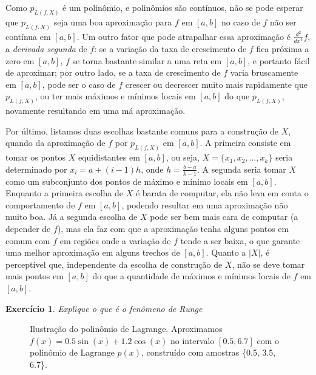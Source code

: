 \documentclass[]{article}
\newtheorem{exercicio}{Exercício}
\numberwithin{equation}{section}
\begin{document}
Como $p_{L(f, X)}$ é um polinômio, e polinômios são contínuos, não se
pode esperar que $p_{L(f, X)}$ seja uma boa aproximação para $f$ em
$[a, b]$ no caso de $f$ não ser contínua em $[a, b]$. Um outro fator
que pode atrapalhar essa aproximação é $\frac{d^2}{dx^2} f$, a
\emph{derivada segunda} de $f$: se a variação da taxa de crescimento
de $f$ fica próxima a zero em $[a, b]$, $f$ se torna bastante similar
a uma reta em $[a, b]$, e portanto fácil de aproximar; por outro lado,
se a taxa de crescimento de $f$ varia bruscamente em $[a, b]$, pode
ser o caso de $f$ crescer ou decrescer muito mais rapidamente que
$p_{L(f, X)}$, ou ter mais máximos e mínimos locais em $[a, b]$ do que
$p_{L(f, X)}$, novamente resultando em uma má aproximação.

Por último, listamos duas escolhas bastante comuns para a construção
de $X$, quando da aproximação de $f$ por $p_{L(f, X)}$ em $[a, b]$. A
primeira consiste em tomar os pontos $X$ equidistantes em $[a, b]$, ou
seja, $X = \{x_1, x_2, \dots, x_k\}$ seria determinado por
$x_i = a + (i - 1)h$, onde $h = \frac{b - a}{k - 1}$. A segunda seria
tomar $X$ como um subconjunto dos pontos de máximo e mínimo locais em
$[a, b]$. Enquanto a primeira escolha de $X$ é barata de computar, ela
não leva em conta o comportamento de $f$ em $[a, b]$, podendo resultar
em uma aproximação não muito boa. Já a segunda escolha de $X$ pode ser
bem mais cara de computar (a depender de $f$), mas ela faz com que a
aproximação tenha alguns pontos em comum com $f$ em regiões onde a
variação de $f$ tende a ser baixa, o que garante uma melhor
aproximação em alguns trechos de $[a, b]$. Quanto a $|X|$, é
perceptível que, independente da escolha de construção de $X$, não se
deve tomar mais pontos em $[a, b]$ do que a quantidade de máximos e
mínimos locais de $f$ em $[a, b]$.

\begin{exercicio} \label{exercicioFenomenoRunge}
	Explique o que é o \emph{fenômeno de Runge}
\end{exercicio}

\begin{figure}
  \centering
  \caption{Ilustração do polinômio de Lagrange. Aproximamos
    $f(x) = 0.5\sin(x) + 1.2\cos(x)$ no intervalo $[0.5, 6.7]$ com o
    polinômio de Lagrange $p(x)$, construído com amostras \{0.5, 3.5,
    6.7\}.}
\end{figure}
\end{document}
